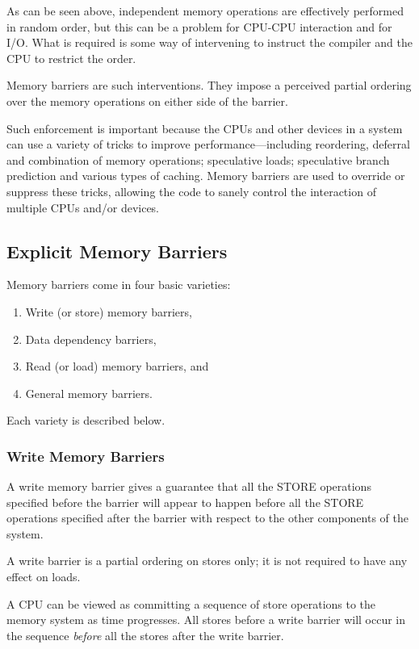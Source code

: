As can be seen above, independent memory operations are effectively performed
in random order, but this can be a problem for CPU-CPU interaction and for I/O.
What is required is some way of intervening to instruct the compiler and the
CPU to restrict the order.

Memory barriers are such interventions.  They impose a perceived partial
ordering over the memory operations on either side of the barrier.

Such enforcement is important because the CPUs and other devices in a system
can use a variety of tricks to improve performance---including reordering,
deferral and combination of memory operations; speculative loads; speculative
branch prediction and various types of caching.  Memory barriers are used to
override or suppress these tricks, allowing the code to sanely control the
interaction of multiple CPUs and/or devices.

\subsection{Explicit Memory Barriers}
\label{sec:memorder:Explicit Memory Barriers}

Memory barriers come in four basic varieties:

\begin{enumerate}
\item	Write (or store) memory barriers,
\item	Data dependency barriers,
\item	Read (or load) memory barriers, and
\item	General memory barriers.
\end{enumerate}

Each variety is described below.

\subsubsection{Write Memory Barriers}

A write memory barrier gives a guarantee that all the STORE operations
specified before the barrier will appear to happen before all the STORE
operations specified after the barrier with respect to the other
components of the system.

A write barrier is a partial ordering on stores only; it is not required
to have any effect on loads.

A CPU can be viewed as committing a sequence of store operations to the
memory system as time progresses.  All stores before a write barrier will
occur in the sequence \emph{before} all the stores after the write barrier.


